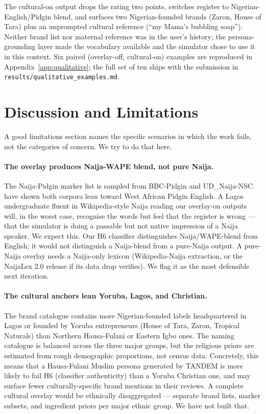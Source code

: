 \documentclass[8pt,twocolumn,a4paper]{extarticle}
\begin{document}
The cultural-on output drops the rating two points, switches register to Nigerian-English/Pidgin blend, and surfaces two Nigerian-founded brands (Zaron, House of Tara) plus an unprompted cultural reference (``my Mama's bubbling soap''). Neither brand list nor maternal reference was in the user's history; the persona-grounding layer made the vocabulary available and the simulator chose to use it in this context. Six paired (overlay-off, cultural-on) examples are reproduced in Appendix~\ref{app:qualitative}; the full set of ten ships with the submission in \texttt{results/qualitative\_examples.md}.

\section{Discussion and Limitations}
\label{sec:discussion}

A good limitations section names the specific scenarios in which the work fails, not the categories of concern. We try to do that here.

\paragraph{The overlay produces Naija-WAPE blend, not pure Naija.}
The Naija-Pidgin marker list is sampled from BBC-Pidgin and UD\_Naija-NSC.~\citet{adelani2024naija} have shown both corpora lean toward West African Pidgin English. A Lagos undergraduate fluent in Wikipedia-style Naija reading our overlay-on outputs will, in the worst case, recognise the words but feel that the register is wrong --- that the simulator is doing a passable but not native impression of a Naija speaker. We expect this. Our H6 classifier distinguishes Naija/WAPE-blend from English; it would not distinguish a Naija-blend from a pure-Naija output. A pure-Naija overlay needs a Naija-only lexicon (Wikipedia-Naija extraction, or the NaijaLex 2.0 release if its data drop verifies). We flag it as the most defensible next iteration.

\paragraph{The cultural anchors lean Yoruba, Lagos, and Christian.}
The brand catalogue contains more Nigerian-founded labels headquartered in Lagos or founded by Yoruba entrepreneurs (House of Tara, Zaron, Tropical Naturals) than Northern Hausa-Fulani or Eastern Igbo ones. The naming catalogue is balanced across the three major groups, but the religious priors are estimated from rough demographic proportions, not census data. Concretely, this means that a Hausa-Fulani Muslim persona generated by TANDEM is more likely to fail H6 (classifier authenticity) than a Yoruba Christian one, and may surface fewer culturally-specific brand mentions in their reviews. A complete cultural overlay would be ethnically disaggregated --- separate brand lists, marker subsets, and ingredient priors per major ethnic group. We have not built that.
\end{document}
